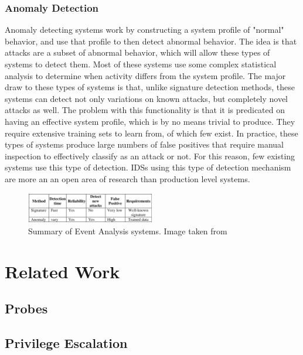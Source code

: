 \documentclass{acm_proc_article-sp}
\begin{document}
    	\subsubsection{Anomaly Detection}
    		Anomaly detecting systems work by constructing a system profile of "normal" behavior, and use that profile to then detect abnormal behavior. The idea is that attacks are a subset of abnormal behavior, which will allow these types of systems to detect them. Most of these systems use some complex statistical analysis to determine when activity differs from the system profile. The major draw to these types of systems is that, unlike signature detection methods, these systems can detect not only variations on known attacks, but completely novel attacks as well. The problem with this functionality is that it is predicated on having an effective system profile, which is by no means trivial to produce. They require extensive training sets to learn from, of which few exist. In practice, these types of systems produce large numbers of false positives that require manual inspection to effectively classify as an attack or not. For this reason, few existing systems use this type of detection. IDSs using this type of detection mechanism are more an an open area of research than production level systems. 
    		\begin{figure}[h!]
		\centering
		\includegraphics[width=0.5\textwidth]{signatreVSanomaly.png}
		\caption{Summary of Event Analysis systems. Image taken from \cite{Alenezi2012}}
		\label{comparison}
	\end{figure}
			

\section{Related Work}
    \subsection{Probes}
    \subsection{Privilege Escalation}
\end{document}
